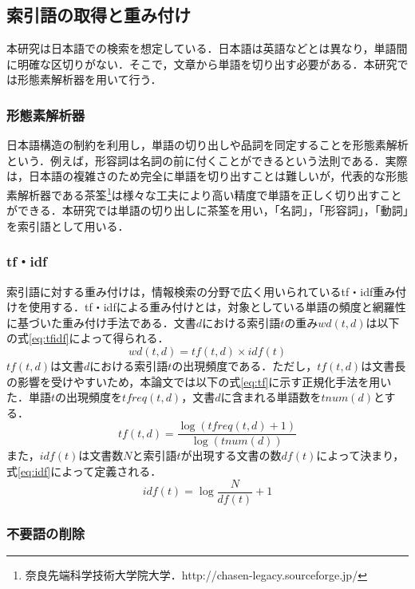 \documentclass[japanese]{jnlp_1.4}
\begin{document}
\subsection{索引語の取得と重み付け}

本研究は日本語での検索を想定している．日本語は英語などとは異なり，単語間に明確な区切りがない．そこで，文章から単語を切り出す必要がある．本研究では形態素解析器を用いて行う．

\subsubsection{形態素解析器}

日本語構造の制約を利用し，単語の切り出しや品詞を同定することを形態素解析という．例えば，形容詞は名詞の前に付くことができるという法則である．実際は，日本語の複雑さのため完全に単語を切り出すことは難しいが，代表的な形態素解析器である茶筌\footnote{奈良先端科学技術大学院大学．http://chasen-legacy.sourceforge.jp/}は様々な工夫により高い精度で単語を正しく切り出すことができる．本研究では単語の切り出しに茶筌を用い，「名詞」，「形容詞」，「動詞」を索引語として用いる．

\subsubsection{tf・idf}\label{tf_idf}

索引語に対する重み付けは，情報検索の分野で広く用いられているtf・idf重み付け\cite{Salton:88}を使用する．tf・idfによる重み付けとは，対象としている単語の頻度と網羅性に基づいた重み付け手法である．文書$d$における索引語$t$の重み$wd(t,d)$は以下の式\ref{eq:tfidf}によって得られる．
\begin{equation}
 wd(t,d)=tf(t,d){\times}idf(t)\label{eq:tfidf}
\end{equation}
$tf(t,d)$は文書$d$における索引語$t$の出現頻度である．ただし，$tf(t,d)$は文書長の影響を受けやすいため，本論文では以下の式\ref{eq:tf}に示す正規化手法を用いた．単語$t$の出現頻度を$tfreq(t,d)$，文書$d$に含まれる単語数を$tnum(d)$とする．
\begin{equation}
 tf(t,d)=\frac{\log(tfreq(t,d)+1)}{\log(tnum(d))}\label{eq:tf}
\end{equation}
また，$idf(t)$は文書数$N$と索引語$t$が出現する文書の数$df(t)$によって決まり，式\ref{eq:idf}によって定義される．
\begin{equation}
 idf(t)=\log\frac{N}{df(t)}+1\label{eq:idf}
\end{equation}

\subsubsection{不要語の削除}
\end{document}
